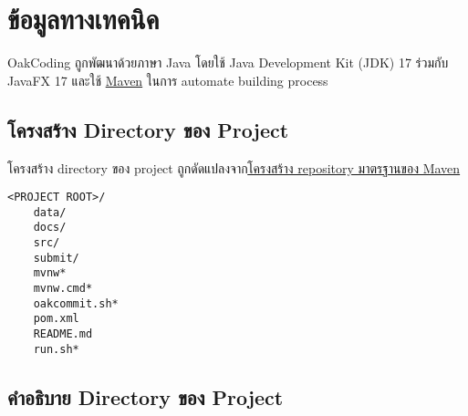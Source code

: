 \clearpage

\section*{ข้อมูลทางเทคนิค}

OakCoding ถูกพัฒนาด้วยภาษา Java โดยใช้ Java Development Kit (JDK) 17
\mbox{ร่วมกับ} JavaFX 17 และใช้ \href{https://maven.apache.org/}{Maven} ในการ automate building process

\rule{0em}{1ex}
\subsection*{โครงสร้าง Directory ของ Project}

โครงสร้าง directory ของ project ถูกดัดแปลงจาก\href{https://maven.apache.org/guides/introduction/introduction-to-the-standard-directory-layout.html}{โครงสร้าง repository มาตรฐานของ Maven}

\setlength{\parindent}{0em}
\setlength{\columnsep}{2pt}
\begin{lstlisting}[name={โครงสร้าง Directory ของ Project},numbers=none]
<PROJECT ROOT>/
    data/
    docs/
    src/
    submit/
    mvnw*
    mvnw.cmd*
    oakcommit.sh*
    pom.xml
    README.md
    run.sh*
\end{lstlisting}

\clearpage

\subsection*{คำอธิบาย Directory ของ Project}


